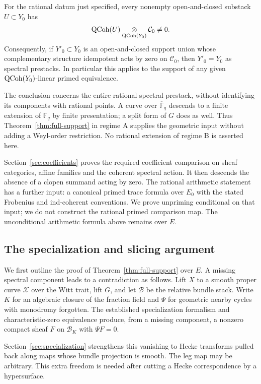 \begin{theorem}\label{thm:rational-support}
For the rational datum just specified, every nonempty open-and-closed
substack $U\subset Y_0$ has
\[
 \operatorname{QCoh}(U)\underset{\operatorname{QCoh}(Y_0)}\otimes\mathcal C_0\ne0.
\]
Consequently, if $Y'_0\subset Y_0$ is an open-and-closed support union
whose complementary structure idempotent acts by zero on
$\mathcal C_0$, then $Y'_0=Y_0$
as spectral prestacks. In particular this applies to the support of
any given $\operatorname{QCoh}(Y_0)$-linear primed equivalence.
\end{theorem}

The conclusion concerns the entire rational spectral prestack, without
identifying its components with rational points. A curve over
$\overline{\mathbb F}_q$ descends to a finite extension of
$\mathbb F_q$ by finite presentation; a split form of $G$ does as well.
Thus Theorem~\ref{thm:full-support} in regime A supplies the geometric
input without adding a Weyl-order restriction. No rational extension
of regime B is asserted here.

Section~\ref{sec:coefficients} proves the required coefficient comparison
on sheaf categories, affine families and the coherent spectral action.
It then descends the absence of a clopen summand acting by zero.
The rational arithmetic statement has a further input: a canonical
primed trace formula over $E_0$ with the stated Frobenius and
ind-coherent conventions. We prove unpriming conditional on that input;
we do not construct the rational primed comparison map. The
unconditional arithmetic formula above remains over $E$.

\subsection{The specialization and slicing argument}

We first outline the proof of Theorem~\ref{thm:full-support} over $E$.
A missing spectral component leads to a contradiction as follows.
Lift $X$ to a smooth proper curve $\mathscr X$ over the Witt trait,
lift $G$, and let $\mathcal B$ be the relative bundle stack. Write
$K$ for an algebraic closure of the fraction field and $\Psi$ for
geometric nearby cycles with monodromy forgotten. The established
specialization formalism and characteristic-zero equivalence produce,
from a missing component, a nonzero compact sheaf $F$ on
$\mathcal B_K$ with $\Psi F=0$.

Section~\ref{sec:specialization} strengthens this vanishing to Hecke
transforms pulled back along maps whose bundle projection is smooth.
The leg map may be arbitrary. This extra freedom is needed after
cutting a Hecke correspondence by a hypersurface.

